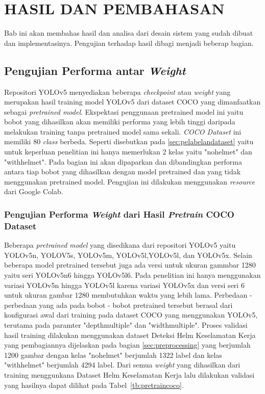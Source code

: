 \chapter{HASIL DAN PEMBAHASAN}
\label{chap:hasilpembahasan}


Bab ini akan membahas hasil dan analisa dari desain sistem yang sudah dibuat dan implementasinya. Pengujian terhadap hasil dibagi menjadi beberap bagian.

\section{Pengujian Performa antar \emph{Weight}}
\label{sec:ujiperforma}
\par Repositori YOLOv5 menyediakan beberapa \emph{checkpoint} atau \emph{weight} yang 
merupakan hasil training model YOLOv5 dari dataset COCO yang dimanfaatkan sebagai 
\emph{pretrained model}. Ekspektasi penggunaan pretrained model ini yaitu bobot yang 
dihasilkan akan memiliki performa yang lebih tinggi daripada melakukan training tanpa 
pretrained model sama sekali. \emph{COCO Dataset} ini memiliki 80 \emph{class} berbeda. 
Seperti disebutkan pada \ref{sec:pelabelandataset} yaitu untuk keperluan penelitian ini 
hanya memerlukan 2 kelas yaitu "no\textunderscore helmet" dan "with\textunderscore helmet". 
Pada bagian ini akan dipaparkan dan dibandingkan performa antara tiap bobot yang dihasilkan 
dengan model pretrained dan yang tidak menggunakan pretrained model. Pengujian ini dilakukan menggunakan
\emph{resource} dari Google Colab.

\subsection{Pengujian Performa \emph{Weight} dari Hasil \emph{Pretrain} COCO Dataset}
\label{subsec:ujiperforma_coco}
Beberapa \emph{pretrained model} yang disedikana dari repositori YOLOv5 yaitu YOLOv5n, YOLOV5s, YOLOv5m, YOLOv5l,YOLOv5l, dan YOLOv5x. Selain beberapa model pretrained tersebut juga ada versi untuk ukuran gammbar 1280 yaitu seri YOLOv5n6 hingga YOLOv5l6. Pada penelitian ini hanya menggunakan variasi YOLOv5n hingga YOLOv5l karena variasi YOLOv5x dan versi seri 6 untuk ukuran gambar 1280 membutuhkan waktu yang lebih lama. Perbedaan - perbedaan yang ada pada bobot - bobot pretrained tersebut berasal dari konfigurasi awal dari training pada dataset COCO yang menggunakan YOLOv5, terutama pada paramter "depth\textunderscore multiple" dan "width\textunderscore multiple".
Proses validasi hasil training dilakukan menggunakan dataset Deteksi Helm Keselamatan Kerja yang pembagiannya dijelaskan pada bagian \ref{sec:preprocessing} yang berjumlah 1200 gambar dengan kelas "no\textunderscore helmet" berjumlah 1322 label dan kelas "with\textunderscore helmet" berjumlah 4294 label. Dari semua \emph{weight} yang dihasilkan dari training menggunkana Dataset Helm Keselamatan Kerja lalu dilakukan validasi yang hasilnya dapat dilihat pada Tabel~\ref{tb:pretraincoco}.


